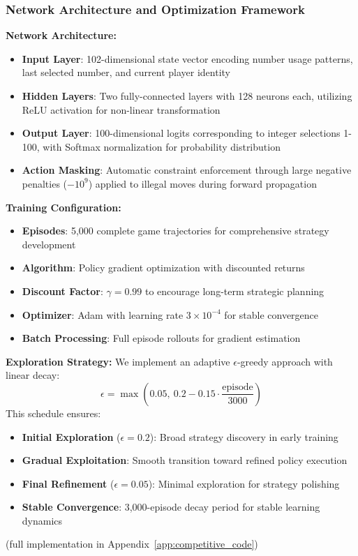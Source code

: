 \documentclass[twocolumn, a4paper]{article}
\begin{document}
\subsubsection{Network Architecture and Optimization Framework}
\textbf{Network Architecture:}
\begin{itemize}
\item \textbf{Input Layer}: 102-dimensional state vector encoding number usage patterns, last selected number, and current player identity
\item \textbf{Hidden Layers}: Two fully-connected layers with 128 neurons each, utilizing ReLU activation for non-linear transformation
\item \textbf{Output Layer}: 100-dimensional logits corresponding to integer selections 1-100, with Softmax normalization for probability distribution
\item \textbf{Action Masking}: Automatic constraint enforcement through large negative penalties ($-10^9$) applied to illegal moves during forward propagation
\end{itemize}

\textbf{Training Configuration:}
\begin{itemize}
\item \textbf{Episodes}: 5,000 complete game trajectories for comprehensive strategy development
\item \textbf{Algorithm}: Policy gradient optimization with discounted returns
\item \textbf{Discount Factor}: $\gamma = 0.99$ to encourage long-term strategic planning
\item \textbf{Optimizer}: Adam with learning rate $3\times10^{-4}$ for stable convergence
\item \textbf{Batch Processing}: Full episode rollouts for gradient estimation
\end{itemize}



\textbf{Exploration Strategy:}
We implement an adaptive $\epsilon$-greedy approach with linear decay:
\[
\epsilon = \max\left(0.05,\ 0.2 - 0.15\cdot\frac{\text{episode}}{3000}\right)
\]
This schedule ensures:
\begin{itemize}
\item \textbf{Initial Exploration} ($\epsilon = 0.2$): Broad strategy discovery in early training
\item \textbf{Gradual Exploitation}: Smooth transition toward refined policy execution  
\item \textbf{Final Refinement} ($\epsilon = 0.05$): Minimal exploration for strategy polishing
\item \textbf{Stable Convergence}: 3,000-episode decay period for stable learning dynamics
\end{itemize}
(full implementation in Appendix~\ref{app:competitive_code})
\end{document}

